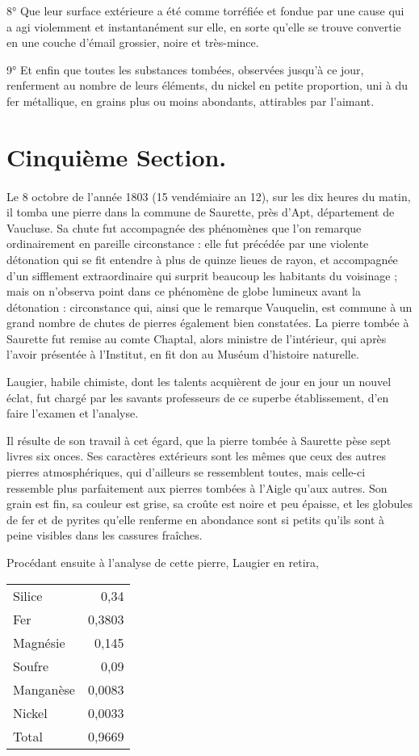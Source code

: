 \documentclass[a4paper, 12pt, oneside, french]{article}
\begin{document}
8° Que leur surface extérieure a été comme torréfiée et fondue par une cause qui a agi violemment et instantanément sur elle, en sorte qu'elle se trouve convertie en une couche d'émail grossier, noire et très-mince.

9° Et enfin que toutes les substances tombées, observées jusqu'à ce jour, renferment au nombre de leurs éléments, du nickel en petite proportion, uni à du fer métallique, en grains plus ou moins abondants, attirables par l'aimant.
\clearpage
\section{Cinquième Section.}
\paragraph{}
Le 8 octobre de l'année 1803 (15 vendémiaire an 12), sur les dix heures du matin, il tomba une pierre dans la commune de Saurette, près d'Apt, département de Vaucluse. Sa chute fut accompagnée des phénomènes que l'on remarque ordinairement en pareille circonstance : elle fut précédée par une violente détonation qui se fit entendre à plus de quinze lieues de rayon, et accompagnée d'un sifflement extraordinaire qui surprit beaucoup les habitants du voisinage ; mais on n'observa point dans ce phénomène de globe lumineux avant la détonation : circonstance qui, ainsi que le remarque Vauquelin, est commune à un grand nombre de chutes de pierres également bien constatées. La pierre tombée à Saurette fut remise au comte Chaptal, alors ministre de l'intérieur, qui après l'avoir présentée à l'Institut, en fit don au Muséum d'histoire naturelle.

Laugier, habile chimiste, dont les talents acquièrent de jour en jour un nouvel éclat, fut chargé par les savants professeurs de ce superbe établissement, d'en faire l'examen et l'analyse.

Il résulte de son travail à cet égard, que la pierre tombée à Saurette pèse sept livres six onces. Ses caractères extérieurs sont les mêmes que ceux des autres pierres atmosphériques, qui d'ailleurs se ressemblent toutes, mais celle-ci ressemble plus parfaitement aux pierres tombées à l'Aigle qu'aux autres. Son grain est fin, sa couleur est grise, sa croûte est noire et peu épaisse, et les globules de fer et de pyrites qu'elle renferme en abondance sont si petits qu'ils sont à peine visibles dans les cassures fraîches.

Procédant ensuite à l'analyse de cette pierre, Laugier en retira,
\begin{table}[H]
    \centering
    \begin{tabular}{l r}
        Silice & 0,34 \\
        Fer & 0,3803 \\
        Magnésie & 0,145 \\
        Soufre & 0,09 \\
        Manganèse & 0,0083 \\
        Nickel & 0,0033 \\ \hline
        Total & 0,9669 \\
    \end{tabular}
\end{table}
\end{document}
